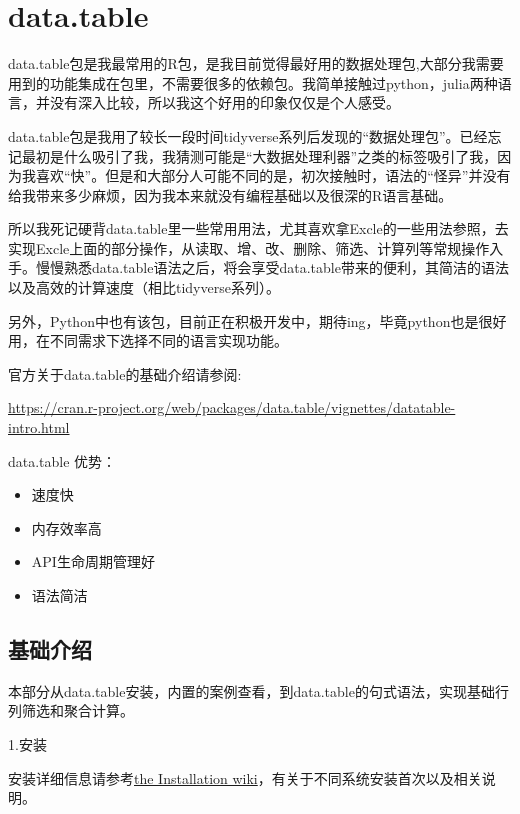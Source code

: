 \documentclass[
]{book}
\providecommand{\tightlist}{%
  \setlength{\itemsep}{0pt}\setlength{\parskip}{0pt}}
\begin{document}
\hypertarget{data.table}{%
\chapter{data.table}\label{data.table}}

data.table包是我最常用的R包，是我目前觉得最好用的数据处理包,大部分我需要用到的功能集成在包里，不需要很多的依赖包。我简单接触过python，julia两种语言，并没有深入比较，所以我这个好用的印象仅仅是个人感受。

data.table包是我用了较长一段时间tidyverse系列后发现的``数据处理包''。已经忘记最初是什么吸引了我，我猜测可能是``大数据处理利器''之类的标签吸引了我，因为我喜欢``快''。但是和大部分人可能不同的是，初次接触时，语法的``怪异''并没有给我带来多少麻烦，因为我本来就没有编程基础以及很深的R语言基础。

所以我死记硬背data.table里一些常用用法，尤其喜欢拿Excle的一些用法参照，去实现Excle上面的部分操作，从读取、增、改、删除、筛选、计算列等常规操作入手。慢慢熟悉data.table语法之后，将会享受data.table带来的便利，其简洁的语法以及高效的计算速度（相比tidyverse系列）。

另外，Python中也有该包，目前正在积极开发中，期待ing，毕竟python也是很好用，在不同需求下选择不同的语言实现功能。

官方关于data.table的基础介绍请参阅:

\url{https://cran.r-project.org/web/packages/data.table/vignettes/datatable-intro.html}

data.table 优势：

\begin{itemize}
\tightlist
\item
  速度快
\item
  内存效率高
\item
  API生命周期管理好
\item
  语法简洁
\end{itemize}

\hypertarget{ux57faux7840ux4ecbux7ecd}{%
\section{基础介绍}\label{ux57faux7840ux4ecbux7ecd}}

本部分从data.table安装，内置的案例查看，到data.table的句式语法，实现基础行列筛选和聚合计算。

1.安装

安装详细信息请参考\href{https://github.com/Rdatatable/data.table/wiki/Installation}{the Installation wiki}，有关于不同系统安装首次以及相关说明。
\end{document}
